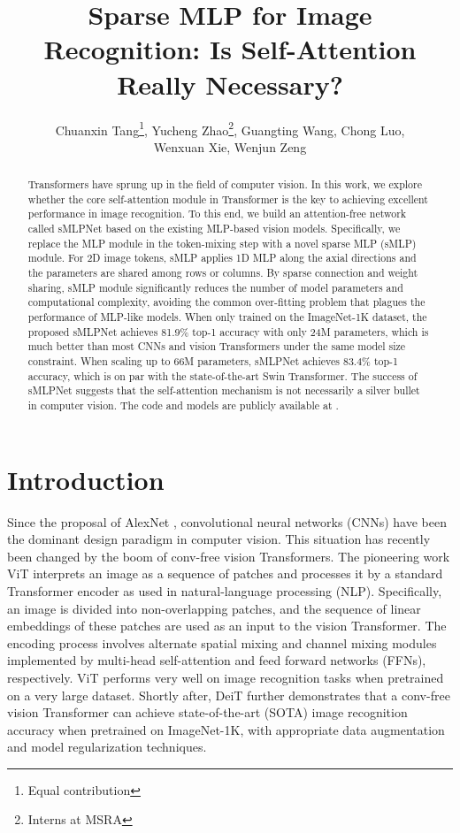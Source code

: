 \documentclass[letterpaper]{article} \usepackage{aaai22}  \usepackage{times}  \usepackage{helvet}  \usepackage{courier}  \usepackage[hyphens]{url}  \usepackage{graphicx} \usepackage{color}
\title{Sparse MLP for Image Recognition: Is Self-Attention Really Necessary?}
\author{


    Chuanxin Tang\thanks{Equal contribution},
    Yucheng Zhao\footnotemark[1]\thanks{Interns at MSRA},
    Guangting Wang\footnotemark[1]\footnotemark[2],
    Chong Luo, \\
    Wenxuan Xie,
    Wenjun Zeng
}
\begin{document}
\maketitle


\begin{abstract}
Transformers have sprung up in the field of computer vision. In this work, we explore whether the core self-attention module in Transformer is the key to achieving excellent performance in image recognition. To this end, we build an attention-free network called sMLPNet based on the existing MLP-based vision models. Specifically, we replace the MLP module in the token-mixing step with a novel sparse MLP (sMLP) module. For 2D image tokens, sMLP applies 1D MLP along the axial directions and the parameters are shared among rows or columns. By sparse connection and weight sharing, sMLP module significantly reduces the number of model parameters and computational complexity, avoiding the common over-fitting problem that plagues the performance of MLP-like models. When only trained on the ImageNet-1K dataset, the proposed sMLPNet achieves 81.9\% top-1 accuracy with only 24M parameters, which is much better than most CNNs and vision Transformers under the same model size constraint. When scaling up to 66M parameters, sMLPNet achieves 83.4\% top-1 accuracy, which is on par with the state-of-the-art Swin Transformer. The success of sMLPNet suggests that the self-attention mechanism is not necessarily a
silver bullet in computer vision. The code and models are publicly available at {\footnotesize{}}.
\end{abstract}







\section{Introduction}
Since the proposal of AlexNet \cite{krizhevsky2012imagenet}, convolutional neural networks (CNNs) have been the dominant design paradigm in computer vision. This situation has recently been changed by the boom of conv-free vision Transformers. The pioneering work ViT \cite{dosovitskiy2020image} interprets an image as a sequence of patches and processes it by a standard Transformer encoder as used in natural-language processing (NLP). Specifically, an image is divided into non-overlapping patches, and the sequence of linear embeddings of these patches are used as an input to the vision Transformer. The encoding process involves alternate spatial mixing and channel mixing modules implemented by multi-head self-attention and feed forward networks (FFNs), respectively. ViT performs very well on image recognition tasks when pretrained on a very large dataset. Shortly after, DeiT \cite{touvron2021training} further demonstrates that a conv-free vision Transformer can achieve state-of-the-art (SOTA) image recognition accuracy when pretrained on ImageNet-1K, with appropriate data augmentation and model regularization techniques.
\end{document}
